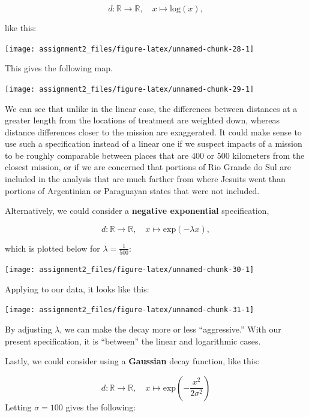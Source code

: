 \documentclass[
  a4paper,
]{article}
\begin{document}
\[
d: \mathbb{R} \to \mathbb{R}, \quad x \mapsto \mathrm{log}(x),
\]

like this:

\begin{center}\texttt{[image: assignment2\_files/figure-latex/unnamed-chunk-28-1]} \end{center}

This gives the following map.

\begin{center}\texttt{[image: assignment2\_files/figure-latex/unnamed-chunk-29-1]} \end{center}

We can see that unlike in the linear case, the differences between
distances at a greater length from the locations of treatment are
weighted down, whereas distance differences closer to the mission are
exaggerated. It could make sense to use such a specification instead of
a linear one if we suspect impacts of a mission to be roughly comparable
between places that are 400 or 500 kilometers from the closest mission,
or if we are concerned that portions of Rio Grande do Sul are included
in the analysis that are much farther from where Jesuits went than
portions of Argentinian or Paraguayan states that were not included.

Alternatively, we could consider a \textbf{negative exponential}
specification,

\[
d: \mathbb{R} \to \mathbb{R}, \quad x \mapsto \mathrm{exp}(-\lambda x),
\]

which is plotted below for \(\lambda = \tfrac{1}{500}\):

\begin{center}\texttt{[image: assignment2\_files/figure-latex/unnamed-chunk-30-1]} \end{center}

Applying to our data, it looks like this:

\begin{center}\texttt{[image: assignment2\_files/figure-latex/unnamed-chunk-31-1]} \end{center}

By adjusting \(\lambda\), we can make the decay more or less
``aggressive.'' With our present specification, it is ``between'' the
linear and logarithmic cases.

Lastly, we could consider using a \textbf{Gaussian} decay function, like
this:

\[
d: \mathbb{R} \to \mathbb{R}, \quad x \mapsto \mathrm{exp}\left(-\frac{x^2}{2\sigma^2}\right)
\] Letting \(\sigma=100\) gives the following:
\end{document}
